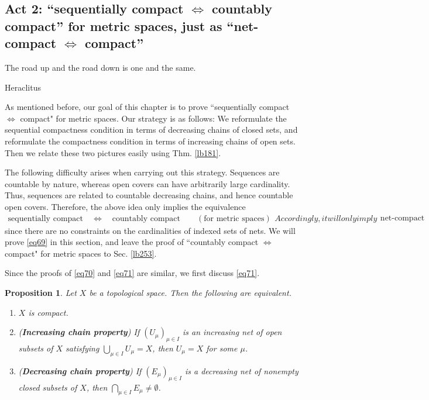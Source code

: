 \documentclass[12pt,b5paper,notitlepage]{article}
\theoremstyle{definition}
\theoremstyle{plain}
\newtheorem{pp}[df]{Proposition}
\numberwithin{equation}{section}
\begin{document}
\subsection{Act 2: ``sequentially compact $\Leftrightarrow$ countably compact'' for metric spaces, just as ``net-compact $\Leftrightarrow$ compact''}\label{lb254}

\epigraph{The road up and the road down is one and the same.}{Heraclitus}


As mentioned before, our goal of this chapter is to prove ``sequentially compact $\Leftrightarrow$ compact" for metric spaces. Our strategy is as follows: We reformulate the sequential compactness condition in terms of decreasing chains of closed sets, and reformulate the compactness condition in terms of increasing chains of open sets. Then we relate these two pictures easily using Thm. \ref{lb181}.

The following difficulty arises when carrying out this strategy. Sequences are countable by nature, whereas open covers can have arbitrarily large cardinality. Thus, sequences are related to countable decreasing chains, and hence countable open covers. Therefore, the above idea only implies the equivalence
\begin{subequations}\label{eq69}
\begin{align}\label{eq70}
\text{sequentially compact}\quad\Longleftrightarrow\quad \text{countably compact}\qquad(\text{for metric spaces})
\end{align}
Accordingly, it will only imply
\begin{align}\label{eq71}
\text{net-compact}\qquad\Longleftrightarrow\qquad \text{compact}
\end{align}
\end{subequations}
since there are no constraints on the cardinalities of indexed sets of nets. We will prove \eqref{eq69} in this section, and leave the proof of ``countably compact $\Leftrightarrow$ compact" for metric spaces to Sec. \ref{lb253}.


Since the proofs of \eqref{eq70} and \eqref{eq71} are similar, we first discuss \eqref{eq71}.


\begin{pp}\label{lb230}
Let $X$ be a topological space. Then the following are equivalent.
\begin{enumerate}[label=(\arabic*)]
\item $X$ is compact.
\item (\textbf{Increasing chain property}) If $(U_\mu)_{\mu\in I}$ is an increasing net of open subsets of $X$ satisfying $\bigcup_{\mu\in I}U_\mu=X$, then $U_\mu=X$ for some $\mu$.
\item (\textbf{Decreasing chain property}) If $(E_\mu)_{\mu\in I}$ is a decreasing net of nonempty closed subsets of $X$, then $\bigcap_{\mu\in I}E_\mu\neq\emptyset$.
\end{enumerate}
\end{pp}
\end{document}
